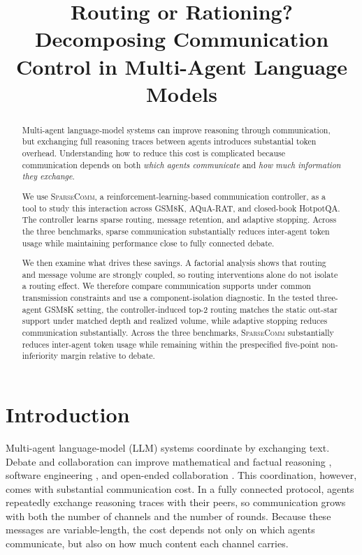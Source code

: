 \documentclass[11pt]{article}
\title{Routing or Rationing?\\
       Decomposing Communication Control in Multi-Agent Language Models}
\newcommand{\sys}{\textsc{SparseComm}\xspace}
\begin{document}
\maketitle

\begin{abstract}
Multi-agent language-model systems can improve reasoning through communication, but exchanging full reasoning traces between agents introduces substantial token overhead. Understanding how to reduce this cost is complicated because communication depends on both \emph{which agents communicate} and \emph{how much information they exchange}.

We use \sys, a reinforcement-learning-based communication controller, as a tool
to study this interaction across GSM8K, AQuA-RAT, and closed-book HotpotQA.
The controller learns sparse routing, message retention, and adaptive stopping.
Across the three benchmarks, sparse communication substantially reduces
inter-agent token usage while maintaining performance close to fully connected
debate.

We then examine what drives these savings. A factorial analysis shows that
routing and message volume are strongly coupled, so routing interventions alone
do not isolate a routing effect. We therefore compare communication supports
under common transmission constraints and use a component-isolation diagnostic.
In the tested three-agent GSM8K setting, the controller-induced top-2 routing
matches the static out-star support under matched depth and realized volume,
while adaptive stopping reduces communication substantially. Across the three
benchmarks, \sys substantially reduces inter-agent token usage while remaining
within the prespecified five-point non-inferiority margin relative to debate.
\end{abstract}
\section{Introduction}
\label{sec:intro}

Multi-agent language-model (LLM) systems coordinate by exchanging text.
Debate and collaboration can improve mathematical and factual reasoning
\citep{du2024improving,liang-etal-2024-encouraging}, software engineering
\citep{hong2024metagpt,qian-etal-2024-chatdev}, and open-ended collaboration
\citep{wu2024autogen,li2023camel,zhuge2024gptswarm}. This coordination,
however, comes with substantial communication cost. In a fully connected
protocol, agents repeatedly exchange reasoning traces with their peers, so
communication grows with both the number of channels and the number of rounds.
Because these messages are variable-length, the cost depends not only on which
agents communicate, but also on how much content each channel carries.
\end{document}
